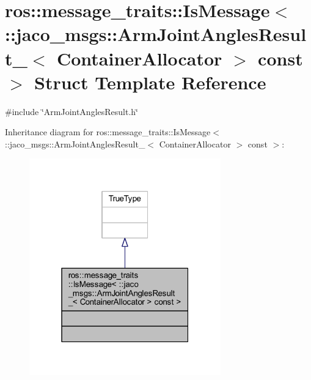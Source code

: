 \hypertarget{structros_1_1message__traits_1_1IsMessage_3_01_1_1jaco__msgs_1_1ArmJointAnglesResult___3_01Contab320d4306643d8c35fa1900717aa7094}{}\section{ros\+:\+:message\+\_\+traits\+:\+:Is\+Message$<$ \+:\+:jaco\+\_\+msgs\+:\+:Arm\+Joint\+Angles\+Result\+\_\+$<$ Container\+Allocator $>$ const $>$ Struct Template Reference}
\label{structros_1_1message__traits_1_1IsMessage_3_01_1_1jaco__msgs_1_1ArmJointAnglesResult___3_01Contab320d4306643d8c35fa1900717aa7094}


{\ttfamily \#include \char`\"{}Arm\+Joint\+Angles\+Result.\+h\char`\"{}}



Inheritance diagram for ros\+:\+:message\+\_\+traits\+:\+:Is\+Message$<$ \+:\+:jaco\+\_\+msgs\+:\+:Arm\+Joint\+Angles\+Result\+\_\+$<$ Container\+Allocator $>$ const $>$\+:
\nopagebreak
\begin{figure}[H]
\begin{center}
\leavevmode
\includegraphics[width=235pt]{df/d4e/structros_1_1message__traits_1_1IsMessage_3_01_1_1jaco__msgs_1_1ArmJointAnglesResult___3_01Contaadea2fe99b02d3fce719b6610b3c55dc}
\end{center}
\end{figure}


